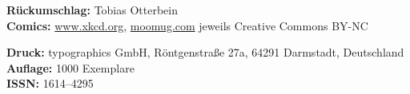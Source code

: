 \vspace{3mm}
\textbf{Rückumschlag:} Tobias Otterbein\\
\textbf{Comics:} \url{www.xkcd.org}, \url{moomug.com} jeweils Creative Commons BY-NC

\vspace{3mm}
\textbf{Druck:} typographics GmbH, Röntgenstraße 27a, 64291 Darmstadt, Deutschland \\
\textbf{Auflage:} 1000 Exemplare \\
\textbf{ISSN:} 1614–4295

\newpage

